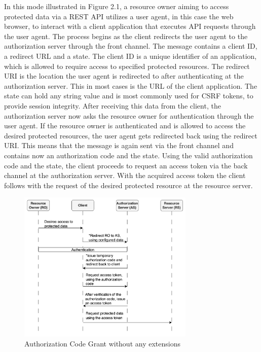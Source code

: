 In this mode illustrated in Figure 2.1, a resource owner aiming to access protected data via a REST API utilizes a user agent, in this case the web browser, to interact with a client application that executes API requests through the user agent. The process begins as the client redirects the user agent to the authorization server through the front channel. The message contains a client ID, a redirect URL and a state. The client ID is a unique identifier of an application, which is allowed to require access to specified protected resources. The redirect URI is the location the user agent is redirected to after authenticating at the authorization server. This in most cases is the URL of the client application. The state can hold any string value and is most commonly used for CSRF tokens, to provide session integrity. After receiving this data from the client, the authorization server now asks the resource owner for authentication through the user agent. If the resource owner is authenticated and is allowed to access the desired protected resources, the user agent gets redirected back using the redirect URI. This means that the message is again sent via the front channel and contains now an authorization code and the state. Using the valid authorization code and the state, the client proceeds to request an access token via the back channel at the authorization server. With the acquired access token the client follows with the request of the desired protected resource at the resource server.

\begin{figure}[H]
	\sffamily\footnotesize
	\includegraphics[width=0.75\textwidth]{pic/authorization_code_grant.png}
	\unitlength=0.75mm
	\linethickness{0.4pt}
	\caption{Authorization Code Grant without any extensions}
	\label{fig:auth_code_grant}
\end{figure}

